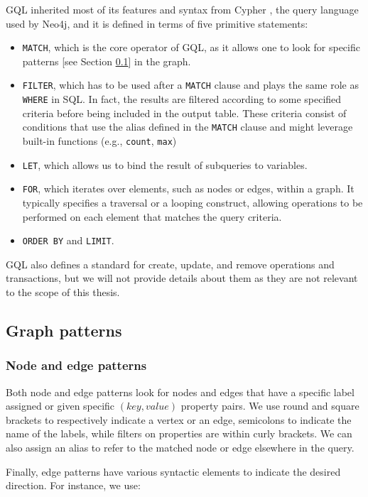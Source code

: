 GQL inherited most of its features and syntax from Cypher \cite{cypher}, the query language used by Neo4j, and it is defined in terms of five primitive statements:
\begin{itemize}
    \item \verb|MATCH|, which is the core operator of GQL, as it allows one to look for specific patterns [see Section \ref{sec:graph-patterns}] in the graph.
    \item \verb|FILTER|, which has to be used after a \verb|MATCH| clause and plays the same role as \verb|WHERE| in SQL. In fact, the results are filtered according to some specified criteria before being included in the output table. These criteria consist of conditions that use the alias defined in the \verb|MATCH| clause and might leverage built-in functions  (e.g.,  \verb|count|, \verb|max|)
    \item \verb|LET|, which allows us to bind the result of subqueries to variables.
    \item \verb|FOR|, which iterates over elements, such as nodes or edges, within a graph. It typically specifies a traversal or a looping construct, allowing operations to be performed on each element that matches the query criteria.
    \item \verb|ORDER BY| and \verb|LIMIT|.
\end{itemize}   
GQL also defines a standard for create, update, and remove operations and transactions, but we will not provide details about them as they are not relevant to the scope of this thesis.


\subsection{Graph patterns}
\label{sec:graph-patterns}

\subsubsection{Node and edge patterns}
Both node and edge patterns look for nodes and edges that have a specific label assigned or given specific $(key, value)$ property pairs. We use round and square brackets to respectively indicate a vertex or an edge, semicolons to indicate the name of the labels, while filters on properties are within curly brackets. We can also assign an alias to refer to the matched node or edge elsewhere in the query.

Finally, edge patterns have various syntactic elements to indicate the desired direction. For instance, we use:

